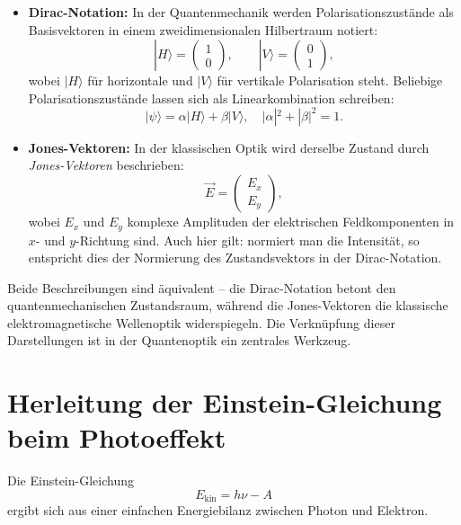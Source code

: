 \begin{itemize}
	\item \textbf{Dirac-Notation:}  
	In der Quantenmechanik werden Polarisationszustände als Basisvektoren in einem zweidimensionalen Hilbertraum notiert:  
	\[
	|H\rangle = \begin{pmatrix}1 \\ 0\end{pmatrix}, \qquad
	|V\rangle = \begin{pmatrix}0 \\ 1\end{pmatrix},
	\]
	wobei $|H\rangle$ für horizontale und $|V\rangle$ für vertikale Polarisation steht.  
	Beliebige Polarisationszustände lassen sich als Linearkombination schreiben:  
	\[
	|\psi\rangle = \alpha |H\rangle + \beta |V\rangle, \quad |\alpha|^2 + |\beta|^2 = 1.
	\]
	
	\item \textbf{Jones-Vektoren:}  
	In der klassischen Optik wird derselbe Zustand durch \emph{Jones-Vektoren} beschrieben:  
	\[
	\vec{E} = \begin{pmatrix} E_x \\ E_y \end{pmatrix},
	\]
	wobei $E_x$ und $E_y$ komplexe Amplituden der elektrischen Feldkomponenten in $x$- und $y$-Richtung sind.  
	Auch hier gilt: normiert man die Intensität, so entspricht dies der Normierung des Zustandsvektors in der Dirac-Notation.
\end{itemize}

\noindent
Beide Beschreibungen sind äquivalent – die Dirac-Notation betont den quantenmechanischen Zustandsraum, während die Jones-Vektoren die klassische elektromagnetische Wellenoptik widerspiegeln.  
Die Verknüpfung dieser Darstellungen ist in der Quantenoptik ein zentrales Werkzeug.
\section{Herleitung der Einstein-Gleichung beim Photoeffekt}
\label{anhangA:photoeffekt}

Die Einstein-Gleichung
\[
E_{\text{kin}} = h \nu - A
\]
ergibt sich aus einer einfachen Energiebilanz zwischen Photon und Elektron.

